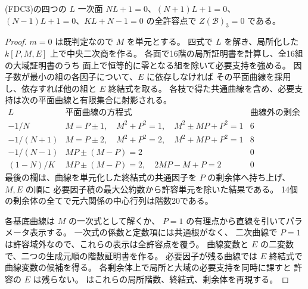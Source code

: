 \begin{proposition}\label{prop:cubic-CY-one-segre-double-split-FDC-linear}
(FDC3)の四つの $L$ 一次面
$NL+1=0$、$(N+1)L+1=0$、$(N-1)L+1=0$、$KL+N-1=0$
の全許容点で $Z(\mathcal B)_3=0$ である。
\end{proposition}
\begin{proof}
$m=0$ は既判定なので $M$ を単元とする。
四式で $L$ を解き、局所化した $k[P,M,E]$ 上で中央二次商を作る。
各面で16階の局所証明書を計算し、全16組の大域証明書のうち
面上で恒等的に零となる組を除いて必要支持を強める。
因子数が最小の組の各因子について、$E$ に依存しなければ
その平面曲線を採用し、依存すれば他の組と $E$ 終結式を取る。
各枝で得た共通曲線を含め、必要支持は次の平面曲線と有限集合に射影される。
\[
\begin{array}{c|l|c}
 L & \text{平面曲線の方程式} & \text{曲線外の剰余体の個数}\\ \hline
 -1/N
 & M=P\pm1,\quad M^2+P^2=1,\quad M^2\pm MP+P^2=1 &6\\
 -1/(N+1)
 & M=P\pm2,\quad M^2+P^2=2,\quad M^2+MP+P^2=1 &8\\
 -1/(N-1)
 & MP\pm(M-P)=2 &0\\
 (1-N)/K
 & MP\pm(M-P)=2,\quad 2MP-M+P=2 &0
\end{array}
\]
最後の欄は、曲線を単元化した終結式の共通因子を
$P$ の剰余体へ持ち上げ、$M,E$ の順に
必要因子積の最大公約数から許容単元を除いた結果である。
14個の剰余体の全てで元六関係の中心行列は階数20である。

各基底曲線は $M$ の一次式として解くか、
$P=1$ の有理点から直線を引いてパラメータ表示する。
一次式の係数と定数項には共通根がなく、
二次曲線で $P=1$ は許容域外なので、これらの表示は全許容点を覆う。
曲線変数と $E$ の二変数で、二つの生成元順の階数証明書を作る。
必要因子が残る曲線では $E$ 終結式で曲線変数の候補を得る。
各剰余体上で局所と大域の必要支持を同時に課すと
許容の $E$ は残らない。
はこれらの局所階数、終結式、剰余体を再現する。
\end{proof}

